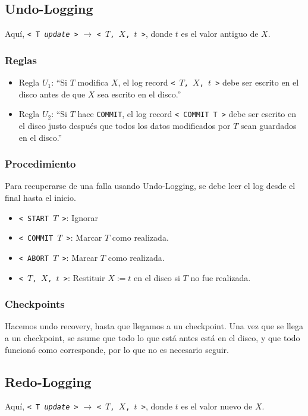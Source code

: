 \subsection{Undo-Logging}
Aquí, \texttt{< T \textit{update} >} $\rightarrow$ \texttt{<\ $T$, $X$, $t$ >}, donde $t$ es el valor antiguo de $X$.

\subsubsection{Reglas}
\begin{itemize}
  \item Regla $U_1$: ``Si $T$ modifica $X$, el log record \texttt{<\ $T$, $X$, $t$ >} debe ser escrito en el disco antes de que $X$ sea escrito en el disco.''
  \item Regla $U_2$: ``Si $T$ hace \texttt{COMMIT}, el log record \texttt{< COMMIT T >} debe ser escrito en el disco justo después que todos los datos modificados por $T$ sean guardados en el disco.''
\end{itemize}

\subsubsection{Procedimiento}
Para recuperarse de una falla usando Undo-Logging, se debe leer el log desde el final hasta el inicio.
\begin{itemize}
  \item \texttt{< START $T$ >}: Ignorar
  \item \texttt{< COMMIT $T$ >}: Marcar $T$ como realizada.
  \item \texttt{< ABORT $T$ >}: Marcar $T$ como realizada.
  \item \texttt{<\ $T$, $X$, $t$ >}: Restituir $X := t$ en el disco si $T$ no fue realizada.
\end{itemize}

\subsubsection{Checkpoints}
Hacemos undo recovery, hasta que llegamos a un checkpoint. Una vez que se llega a un checkpoint, se asume que todo lo que est\'a antes est\'a en el disco, y que todo funcion\'o como corresponde, por lo que no es necesario seguir.


\subsection{Redo-Logging}
Aquí, \texttt{< T \textit{update} >} $\rightarrow$ \texttt{<\ $T$, $X$, $t$ >}, donde $t$ es el valor nuevo de $X$.

